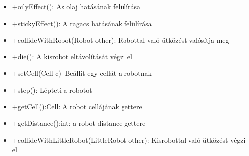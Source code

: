 \begin{itemize}
\begin{itemize}
		\item +oilyEffect(): Az olaj hatásának felülírása
		\item +stickyEffect(): A ragacs hatásának felülírása
		\item +collideWithRobot(Robot other): Robottal való ütközést valósítja meg
		\item +die(): A kisrobot eltávolítását végzi el
		\item +setCell(Cell c): Beállít egy cellát a robotnak
		\item +step(): Lépteti a robotot
		\item +getCell():Cell: A robot cellájának gettere
		\item +getDistance():int: a robot distance gettere
		\item +collideWithLittleRobot(LittleRobot other): Kisrobottal való ütközést végzi el
	\end{itemize}
	\end{itemize}